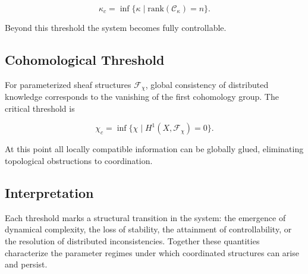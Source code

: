\documentclass[12pt]{article}
\begin{document}
\[
\kappa_c = \inf \{\kappa \mid \mathrm{rank}(\mathcal{C}_\kappa)=n\}.
\]

Beyond this threshold the system becomes fully controllable.

\subsection{Cohomological Threshold}

For parameterized sheaf structures $\mathcal{F}_\chi$, global consistency of distributed knowledge corresponds to the vanishing of the first cohomology group. The critical threshold is

\[
\chi_c = \inf \{\chi \mid H^1(X,\mathcal{F}_\chi)=0\}.
\]

At this point all locally compatible information can be globally glued, eliminating topological obstructions to coordination.

\subsection{Interpretation}

Each threshold marks a structural transition in the system: the emergence of dynamical complexity, the loss of stability, the attainment of controllability, or the resolution of distributed inconsistencies. Together these quantities characterize the parameter regimes under which coordinated structures can arise and persist.

\newpage
\end{document}
